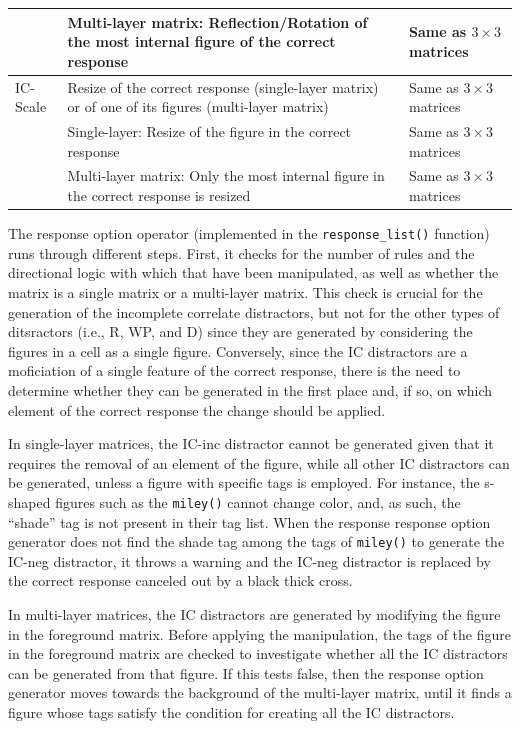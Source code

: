 \begin{table}
\begin{tabular}[t]{>{\raggedright\arraybackslash}p{3cm}|>{\raggedright\arraybackslash}p{5cm}|>{\raggedright\arraybackslash}p{5cm}}
\hline
 & Multi-layer matrix: Reflection/Rotation of the most internal figure of the correct response & Same as $3\times 3$ matrices\\
\hline
IC-Scale & Resize of the correct response (single-layer matrix) or of one of its figures (multi-layer matrix) & Same as $3\times 3$ matrices\\
\hline
 & Single-layer: Resize of the figure in the correct response & Same as $3\times 3$ matrices\\
\hline
 & Multi-layer matrix: Only the most internal figure in the correct response is resized & Same as $3\times 3$ matrices\\
\hline
\end{tabular}
\end{table}

The response option operator (implemented in the \texttt{response\_list()} function) runs through different steps.
First, it checks for the number of rules and the directional logic with which that have been manipulated, as well as whether the matrix is a single matrix or a multi-layer matrix.
This check is crucial for the generation of the incomplete correlate distractors, but not for the other types of ditsractors (i.e., R, WP, and D) since they are generated by considering the figures in a cell as a single figure.
Conversely, since the IC distractors are a moficiation of a single feature of the correct response, there is the need to determine whether they can be generated in the first place and, if so, on which element of the correct response the change should be applied.

In single-layer matrices, the IC-inc distractor cannot be generated given that it requires the removal of an element of the figure, while all other IC distractors can be generated, unless a figure with specific tags is employed.
For instance, the s-shaped figures such as the \texttt{miley()} cannot change color, and, as such, the ``shade'' tag is not present in their tag list.
When the response response option generator does not find the shade tag among the tags of \texttt{miley()} to generate the IC-neg distractor, it throws a warning and the IC-neg distractor is replaced by the correct response canceled out by a black thick cross.

In multi-layer matrices, the IC distractors are generated by modifying the figure in the foreground matrix.
Before applying the manipulation, the tags of the figure in the foreground matrix are checked to investigate whether all the IC distractors can be generated from that figure.
If this tests false, then the response option generator moves towards the background of the multi-layer matrix, until it finds a figure whose tags satisfy the condition for creating all the IC distractors.

